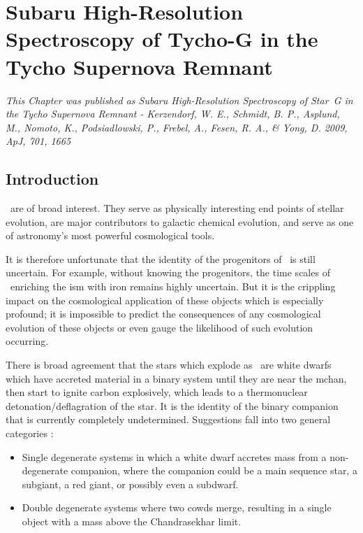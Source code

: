 \chapter[Subaru High-Resolution Spectroscopy of Tycho-G]{Subaru High-Resolution Spectroscopy of Tycho-G in the Tycho Supernova Remnant}
\label{chap:sn1572_starg}

\emph{\small This Chapter was published as Subaru High-Resolution Spectroscopy of Star~G in the Tycho Supernova Remnant - Kerzendorf, W. E., Schmidt, B. P., Asplund, M., Nomoto, K., Podsiadlowski, P., Frebel, A., Fesen, R. A., \& Yong, D. 2009, ApJ, 701, 1665}

\section{Introduction}
\sneia\ are of broad interest. They serve as
physically interesting end points of stellar evolution, are major
contributors to galactic chemical evolution, and serve as one of
astronomy's most powerful cosmological tools.

It is therefore unfortunate that the identity of the progenitors
of \sneia\ is still uncertain. For example, without knowing the progenitors,
the time scales of \sneia\ enriching the \gls{ism} with iron
remains highly uncertain. But it is the crippling impact on the
cosmological application of these objects which is especially
profound; it is impossible to predict the consequences of any
cosmological evolution of these objects or even gauge the likelihood of
such evolution occurring.

There is broad agreement that the stars which explode as \sneia\ are
white dwarfs which have accreted material in a binary system until
they are near the \gls{mchan}, then start to ignite carbon
explosively, which leads to a thermonuclear detonation/deflagration of the
star. It is the identity of the binary companion that is currently
completely undetermined. Suggestions fall into two general categories
\citep{1997thsu.conf..111I}:
\begin{itemize}
\item Single degenerate systems in which a white dwarf accretes mass
from a non-degenerate companion, where the companion could be a
main sequence star, a subgiant, a red giant, or possibly even a
subdwarf.
\item Double degenerate systems where two \glspl{cowd} merge,
resulting in a single object with a mass above the Chandrasekhar limit.
\end{itemize}


